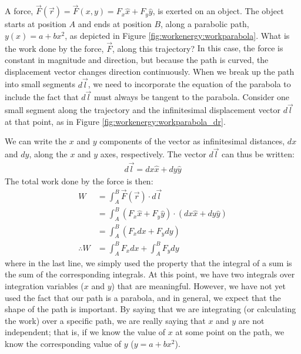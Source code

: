 \newpage
\begin{example}{
A force, $\vec F(\vec r) = \vec F(x,y) = F_x\hat x + F_y \hat y$, is exerted on an object. The object starts at position $A$ and ends at position $B$, along a parabolic path, $y(x) = a+bx^2$, as depicted in Figure \ref{fig:workenergy:workparabola}. What is the work done by the force, $\vec F$, along this trajectory?}
In this case, the force is constant in magnitude and direction, but because the path is curved, the displacement vector changes direction continuously. When we break up the path into small segments $d\vec l$, we need to incorporate the equation of the parabola to include the fact that $d\vec l$ must always be tangent to the parabola. Consider one small segment along the trajectory and the infinitesimal displacement vector $d\vec l$ at that point, as in Figure \ref{fig:workenergy:workparabola_dr}.

We can write the $x$ and $y$ components of the vector as infinitesimal distances, $dx$ and $dy$, along the $x$ and $y$ axes, respectively. The vector $d\vec l$ can thus be written:
\begin{align*}
d\vec l = dx \hat x + dy \hat y
\end{align*}
The total work done by the force is then:
\begin{align*}
W &= \int_A^B \vec F(\vec r) \cdot d\vec l\\
&=\int_A^B (F_x\hat x + F_y \hat y) \cdot (dx \hat x + dy \hat y)\\
&=\int_A^B (F_x dx + F_ydy)\\
\therefore W&= \int_A^B F_x dx + \int_A^B F_ydy
\end{align*}
where in the last line, we simply used the property that the integral of a sum is the sum of the corresponding integrals. At this point, we have two integrals over integration variables ($x$ and $y$) that are meaningful. However, we have not yet used the fact that our path is a parabola, and in general, we expect that the shape of the path is important. By saying that we are integrating (or calculating the work) over a specific path, we are really saying that $x$ and $y$ are not independent; that is, if we know the value of $x$ at some point on the path, we know the corresponding value of $y$ ($y = a+bx^2$). 


\end{example}
